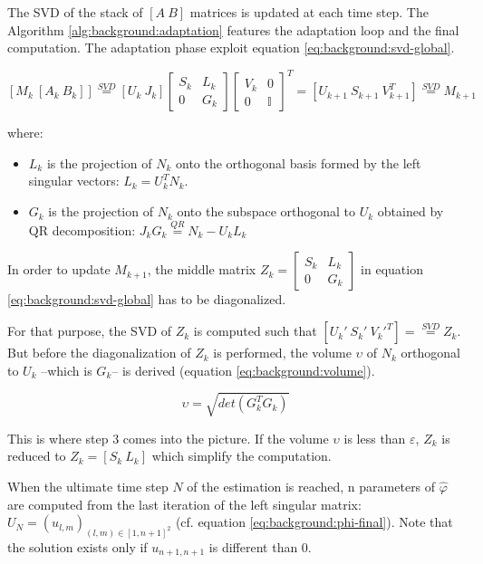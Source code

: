 \documentclass[/home/francois/latex/report/main.tex]{subfiles}
\begin{document}
The \ac{SVD} of the stack of $[A \ B]$ matrices is updated at each time step. The Algorithm \ref{alg:background:adaptation} features the adaptation loop and the final computation. The adaptation phase exploit equation \ref{eq:background:svd-global}.

\begin{equation}
  \label{eq:background:svd-global}
  [M_k \ [A_k \ B_k]] \overset{SVD}{=} [U_k \ J_k]
  \begin{bmatrix}
  S_k &  L_k \\
  0 & G_k
\end{bmatrix}
  \begin{bmatrix}
  V_k &  0 \\
  0 & \mathbb{I}
\end{bmatrix}^T = [U_{k+1} \ S_{k+1} \ V_{k+1}^T]
 \overset{SVD}{=} M_{k+1}
\end{equation}

where:
\begin{itemize}
  \item $L_k$ is the projection of $N_k$ onto the orthogonal basis formed by the left singular vectors: $L_k = U_k^T N_k$.
  \item $G_k$ is the projection of $N_k$ onto the subspace orthogonal to $U_k$ obtained by QR decomposition: $J_k G_k \overset{QR}{=} N_k - U_k L_k$
\end{itemize}

In order to update $M_{k+1}$, the middle matrix $Z_k=
\begin{bmatrix}
  S_k &  L_k \\
  0 & G_k
\end{bmatrix}$
in equation \ref{eq:background:svd-global} has to be diagonalized.

For that purpose, the \ac{SVD} of $Z_k$ is computed such that $[U_{k}' \ S_{k}' \ V_{k}'^T] = \overset{SVD}{=} Z_k$. But before the diagonalization of $Z_k$ is performed, the volume $\upsilon$ of $N_k$ orthogonal to $U_k$ –which is $G_k$– is derived (equation \ref{eq:background:volume}).

\begin{equation}
  \label{eq:background:volume}
  \upsilon = \sqrt{det(G_k^T G_k)}
\end{equation}

This is where step 3 comes into the picture. If the volume $\upsilon$ is less than $\varepsilon$, $Z_k$ is reduced to $Z_k = [S_k \ L_k]$ which simplify the computation.

When the ultimate time step $N$ of the estimation is reached, n parameters of $\hat{\varphi}$ are computed from the last iteration of the left singular matrix: $U_{N} = (u_{l,m})_{(l, m) \in [1,n+1]^2}$ (cf. equation \ref{eq:background:phi-final}). Note that the solution exists only if $u_{n+1, n+1}$ is different than 0.
\end{document}
